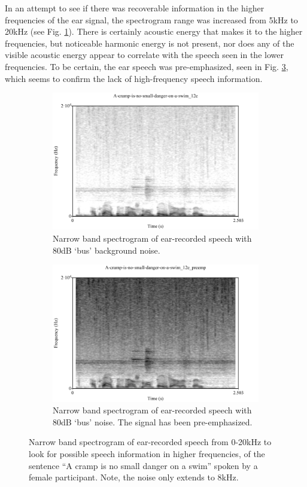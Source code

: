 In an attempt to see if there was recoverable information in the higher frequencies of the ear signal, the spectrogram range was increased from 5kHz to 20kHz (see Fig. \ref{spctgrmEarNarrow20kHz}). There is certainly acoustic energy that makes it to the higher frequencies, but noticeable harmonic energy is not present, nor does any of the visible acoustic energy appear to correlate with the speech seen in the lower frequencies.
To be certain, the ear speech was pre-emphasized, seen in Fig. \ref{spctgrmNarrowEarNoisePremp_35}, which seems to confirm the lack of high-frequency speech information. 
\begin{figure}
\centering
\begin{subfigure}{0.475\textwidth}
  \centering
  \includegraphics[width=1\linewidth]{figure/spctgrmEarNarrow20kHz.pdf}
  \caption{Narrow band spectrogram of ear-recorded speech with 80dB `bus' background noise.}
  \label{spctgrmEarNarrow20kHz}
\end{subfigure}%
\hfill
\begin{subfigure}{0.475\textwidth}
  \centering
  \includegraphics[width=1\linewidth]{figure/spctgrmNarrowEarNoisePremp.pdf}
  \caption{Narrow band spectrogram of ear-recorded speech with 80dB `bus' noise.  The signal has been pre-emphasized.}
  \label{spctgrmNarrowEarNoisePremp_35}
\end{subfigure}
\caption{Narrow band spectrogram of ear-recorded speech from 0-20kHz to look for possible speech information in higher frequencies, of the sentence ``A cramp is no small danger on a swim'' spoken by a female participant. Note, the noise only extends to 8kHz.}
\end{figure}
